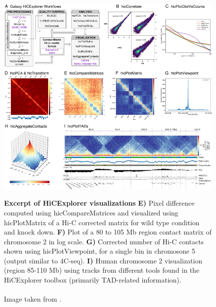 
\begin{figure}[t]
\begin{centering}
    {\includegraphics[scale=3.8,trim=37 0 0 45,clip]{figures/background/HiCExplorer.jpg}}
    \caption[Excerpt of HiCExplorer visualizations]
    {
        \textbf{Excerpt of HiCExplorer visualizations}
        \textbf{E)} Pixel difference computed using hicCompareMatrices and
        visualized using hicPlotMatrix of a Hi-C corrected matrix for wild type
        condition and knock down.
        \textbf{F)} Plot of a 80 to 105 Mb region contact matrix of chromosome 2 in log scale.
        \textbf{G)} Corrected number of Hi-C contacts shown using
        hicPlotViewpoint, for a single bin in chromosone 5 (output similar to
        4C-seq).
        \textbf{I)} Human chromosome 2 visualization (region 85-110 Mb) using
        tracks from different tools found in the HiCExplorer toolbox (primarily
        TAD-related information). \\
        \\Image taken from \cite{wolff2018galaxy}.}
    \label{fig:comparison3C}\label{fig:HiCExplorer}
\end{centering}
\end{figure}



